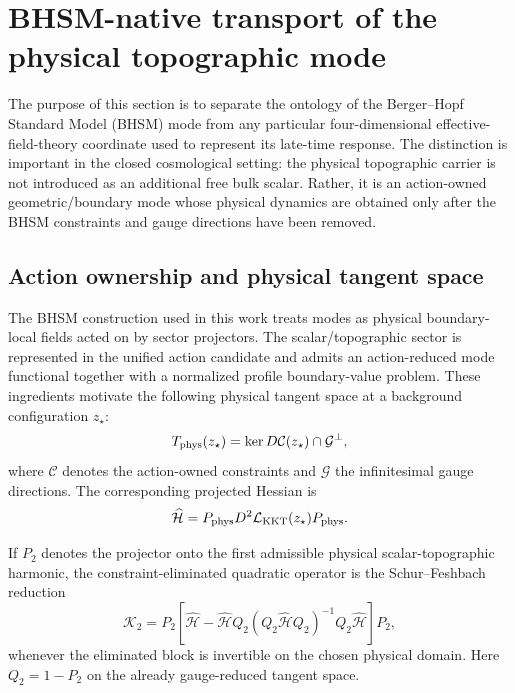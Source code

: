 \section{BHSM-native transport of the physical topographic mode}
\label{sec:bhsm-native-transport}

The purpose of this section is to separate the ontology of the
Berger--Hopf Standard Model (BHSM) mode from any particular four-dimensional
effective-field-theory coordinate used to represent its late-time response.
The distinction is important in the closed cosmological setting: the physical
topographic carrier is not introduced as an additional free bulk scalar.
Rather, it is an action-owned geometric/boundary mode whose physical dynamics
are obtained only after the BHSM constraints and gauge directions have been
removed.

\subsection{Action ownership and physical tangent space}

The BHSM construction used in this work treats modes as physical
boundary-local fields acted on by sector projectors.  The scalar/topographic
sector is represented in the unified action candidate and admits an
action-reduced mode functional together with a normalized profile boundary-value problem.  These ingredients motivate the following physical
tangent space at a background configuration $z_\star$:
\begin{equation}
T_{\rm phys}(z_\star)
=
\ker D\mathcal C(z_\star)\cap\mathcal G^\perp ,
\end{equation}
where $\mathcal C$ denotes the action-owned constraints and $\mathcal G$
the infinitesimal gauge directions.  The corresponding projected Hessian is
\begin{equation}
\widehat{\mathcal H}
=
P_{\rm phys}
D^2\mathcal L_{\rm KKT}(z_\star)
P_{\rm phys}.
\end{equation}

If $P_2$ denotes the projector onto the first admissible physical
scalar-topographic harmonic, the constraint-eliminated quadratic operator is
the Schur--Feshbach reduction
\begin{equation}
\mathcal K_2
=
P_2
\left[
\widehat{\mathcal H}
-
\widehat{\mathcal H}Q_2
\left(
Q_2\widehat{\mathcal H}Q_2
\right)^{-1}
Q_2\widehat{\mathcal H}
\right]
P_2 ,
\label{eq:bhsm-K2}
\end{equation}
whenever the eliminated block is invertible on the chosen physical domain.
Here $Q_2=1-P_2$ on the already gauge-reduced tangent space.

